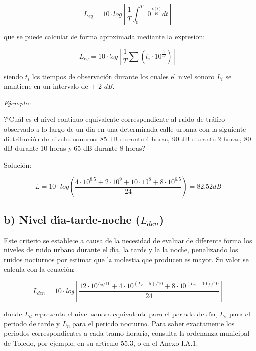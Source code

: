 \documentclass[a4paper,12pt]{article}
\begin{document}
\begin{equation}
L_{eq}=10 \cdot log [ \frac{1}{T} \int_0^T 10^\frac{L(t)}{10} dt ]
\end{equation}

que se puede calcular de forma aproximada mediante la expresi\'on:

\begin{equation}
L_{eq}=10 \cdot log [ \frac{1}{T} \sum \left(t_i \cdot 10^\frac{L_i}{10} \right)]
\end{equation}

siendo $t_i$ los tiempos de observaci\'on durante los cuales el nivel sonoro $L_i$
se mantiene en un intervalo de $\pm$ 2 $dB$.

\underline{\it Ejemplo:}

?`Cu\'al es el nivel continuo equivalente correspondiente al ruido de tr\'afico observado 
a lo largo de un d\'{\i}a en una determinada calle urbana con la siguiente 
distribuci\'on de niveles sonoros: 85 dB durante 4 horas, 90 dB durante 2 horas, 
80 dB durante 10 horas y 65 dB durante 8 horas?

Soluci\'on:

\begin{equation}
L=10 \cdot log(\frac{4 \cdot 10^{8.5}+2 \cdot 10^9+ 10 \cdot 10^8 + 8 \cdot 10^{6.5}}{24})=82.52 dB
\end{equation}

\subsection*{b) Nivel d\'{\i}a-tarde-noche ($L_{den}$)}

Este criterio se establece a causa de la necesidad de evaluar de diferente forma 
los niveles de ruido urbano durante el d\'{\i}a, la tarde y la la noche, penalizando los 
ruidos nocturnos por estimar que la molestia que producen es mayor. Su 
valor se calcula con la ecuaci\'on:

\begin{equation}
	L_{den}=10 \cdot log[\frac{12 \cdot 10^{L_d/10}+ 4 \cdot 10^{(L_e+5)/10} + 8 \cdot 10^{(L_n+10)/10}}{24}]
\end{equation}

donde $L_d$ representa el nivel sonoro equivalente para el periodo de 
d\'{\i}a, $L_e$ para el periodo de tarde y  $L_n$ para el periodo nocturno.
Para saber exactamente los periodos correspondientes a cada tramo horario,
consulta la ordenanza municipal de Toledo, por ejemplo, en su art\'{\i}culo 55.3,
o en el Anexo I.A.1.
\end{document}
